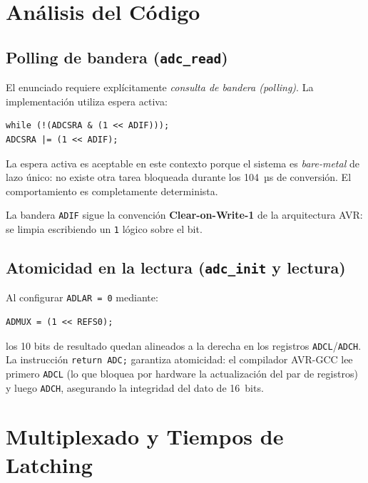 \documentclass[12pt, a4paper]{article}
\begin{document}
\section{Análisis del Código}

\subsection{Polling de bandera (\texttt{adc\_read})}

El enunciado requiere explícitamente \emph{consulta de bandera (polling)}. La
implementación utiliza espera activa:

\begin{lstlisting}[style=avr]
while (!(ADCSRA & (1 << ADIF)));
ADCSRA |= (1 << ADIF);
\end{lstlisting}

La espera activa es aceptable en este contexto porque el sistema es
\emph{bare-metal} de lazo único: no existe otra tarea bloqueada durante los
104~µs de conversión. El comportamiento es completamente determinista.

La bandera \texttt{ADIF} sigue la convención \textbf{Clear-on-Write-1} de la
arquitectura AVR: se limpia escribiendo un \texttt{1} lógico sobre el bit.

\subsection{Atomicidad en la lectura (\texttt{adc\_init} y lectura)}

Al configurar \texttt{ADLAR = 0} mediante:

\begin{lstlisting}[style=avr]
ADMUX = (1 << REFS0);
\end{lstlisting}

los 10 bits de resultado quedan alineados a la derecha en los registros
\texttt{ADCL}/\texttt{ADCH}. La instrucción \texttt{return ADC;} garantiza
atomicidad: el compilador AVR-GCC lee primero \texttt{ADCL} (lo que bloquea
por hardware la actualización del par de registros) y luego \texttt{ADCH},
asegurando la integridad del dato de 16~bits.

\section{Multiplexado y Tiempos de Latching}
\end{document}
